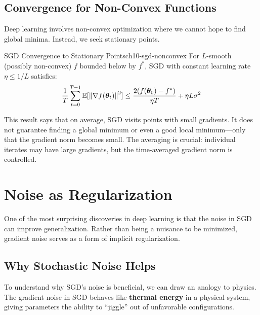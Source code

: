 \documentclass[../../main.tex]{subfiles}
\begin{document}
\subsection{Convergence for Non-Convex Functions}

Deep learning involves non-convex optimization where we cannot hope to find global minima. Instead, we seek stationary points.

\begin{theorem}{SGD Convergence to Stationary Points}{ch10-sgd-nonconvex}
For $L$-smooth (possibly non-convex) $f$ bounded below by $f^*$, SGD with constant learning rate $\eta \leq 1/L$ satisfies:
\[
    \frac{1}{T}\sum_{t=0}^{T-1} \operatorname{\mathbb{E}}[\left\lVert \nabla f(\boldsymbol{\theta}_t) \right\rVert^2] \leq \frac{2(f(\boldsymbol{\theta}_0) - f^*)}{\eta T} + \eta L \sigma^2
\]
\end{theorem}

\begin{intuition}
This result says that on average, SGD visits points with small gradients. It does not guarantee finding a global minimum or even a good local minimum---only that the gradient norm becomes small. The averaging is crucial: individual iterates may have large gradients, but the time-averaged gradient norm is controlled.
\end{intuition}

\section{Noise as Regularization}
\label{sec:ch10-noise-regularization}

One of the most surprising discoveries in deep learning is that the noise in SGD can improve generalization. Rather than being a nuisance to be minimized, gradient noise serves as a form of implicit regularization.

\subsection{Why Stochastic Noise Helps}
\label{sec:ch10-why-noise-helps}

To understand why SGD's noise is beneficial, we can draw an analogy to physics. The gradient noise in SGD behaves like \textbf{thermal energy} in a physical system, giving parameters the ability to ``jiggle'' out of unfavorable configurations.
\end{document}
